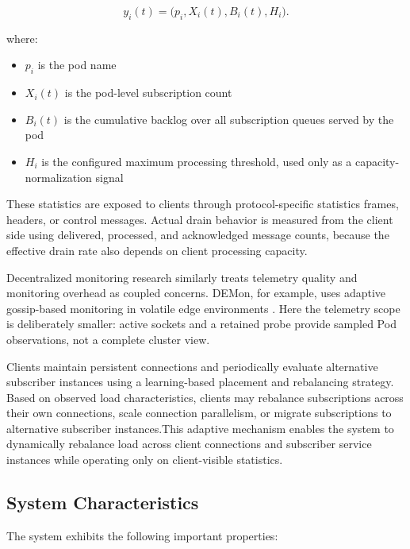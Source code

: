 \begin{equation}
	y_i(t)=\bigl(p_i,X_i(t),B_i(t),H_i\bigr).
\end{equation}

where:

\begin{itemize}
	\item $p_i$ is the pod name
	\item $X_i(t)$ is the pod-level subscription count
	\item $B_i(t)$ is the cumulative backlog over all subscription queues served by the pod
	\item $H_i$ is the configured maximum processing threshold, used only as a capacity-normalization signal
\end{itemize}

These statistics are exposed to clients through protocol-specific statistics
frames, headers, or control messages. Actual drain behavior is measured from the client side using delivered,
processed, and acknowledged message counts, because the effective drain rate also depends on client processing capacity.

Decentralized monitoring research similarly treats telemetry quality and
monitoring overhead as coupled concerns. DEMon, for example, uses adaptive
gossip-based monitoring in volatile edge environments \cite{Ilager2026DEMon}.
Here the telemetry scope is deliberately smaller: active sockets and a retained
probe provide sampled Pod observations, not a complete cluster view.

Clients maintain persistent connections and periodically evaluate alternative subscriber instances using a learning-based placement and rebalancing strategy. Based on observed load characteristics, clients may rebalance subscriptions across their own connections, scale connection parallelism, or migrate subscriptions to alternative subscriber instances.This adaptive mechanism enables the system to dynamically rebalance load across client connections and subscriber service instances while operating only on client-visible statistics.

\subsection{System Characteristics}

The system exhibits the following important properties:

